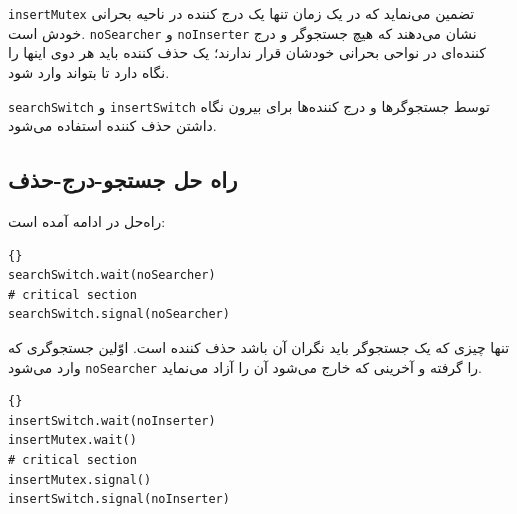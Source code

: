 \documentclass{book}
\newcommand{\clearemptydoublepage}{\newpage\cleardoublepage}
\begin{document}
    {\tt insertMutex}
     تضمین می‌نماید که در یک زمان تنها یک درج کننده در ناحیه بحرانی خودش است. 
      {\tt noSearcher} و {\tt noInserter} 
    نشان می‌دهند که هیچ جستجوگر و درج کننده‌ای در نواحی بحرانی خودشان قرار ندارند؛ یک حذف کننده باید هر دوی 
    اینها را نگاه دارد تا بتواند وارد شود. 

{\tt searchSwitch} و {\tt insertSwitch} 
 توسط جستجوگرها و درج‌ کننده‌ها برای بیرون نگاه داشتن حذف کننده استفاده می‌شود. 


\clearemptydoublepage
\subsection{راه حل جستجو-درج-حذف}

    راه‌حل در ادامه آمده است: 

\begin{latin}
\begin{lstlisting}[title={راه حل جستجو-درج-حذف (جستجوگر)}]{}
searchSwitch.wait(noSearcher)
# critical section
searchSwitch.signal(noSearcher)
\end{lstlisting}
\end{latin}

    تنها چیزی که یک جستجوگر باید نگران آن باشد حذف کننده است. 
    اوّلین جستجوگری که وارد می‌شود {\tt noSearcher} را گرفته و آخرینی که خارج می‌شود آن را آزاد می‌نماید. 

\begin{latin}
\begin{lstlisting}[title={راه حل جستجو-درج-حذف (درج‌کننده)}]{}
insertSwitch.wait(noInserter)
insertMutex.wait()
# critical section
insertMutex.signal()
insertSwitch.signal(noInserter)
\end{lstlisting}
\end{latin}
\end{document}
